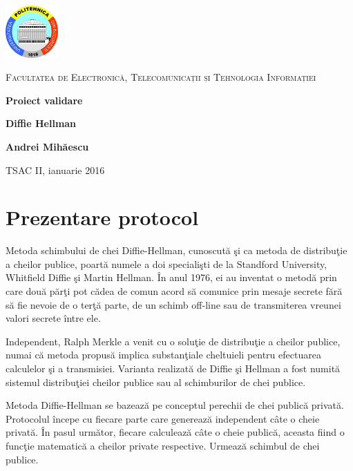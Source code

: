 \documentclass[12pt, a4paper, oneside, romanian]{teza-upb}
\begin{document}
\begin{titlepage}
	\centering
	\includegraphics[width=0.15\textwidth]{img/UPB-logo.png}\par\vspace{1cm}
	{\scshape\LARGE Facultatea de Electronică, Telecomunicații și Tehnologia Informației \par}
	\vspace{1cm}
	{\huge\bfseries Proiect validare\par}
	\vspace{2cm}
	{\Large\bfseries Diffie Hellman\par}
	\vspace{2cm}
	{\Large\bfseries Andrei Mihăescu\par}
	{\large TSAC II, ianuarie 2016\par}

\end{titlepage}
\newpage

\chapter{Prezentare protocol}	
Metoda schimbului de chei Diffie-Hellman, cunoscută şi ca metoda de distribuţie a cheilor publice, poartă numele a doi specialişti de la Standford University, Whitfield Diffie şi Martin Hellman. În anul 1976, ei au inventat o metodă prin care două părţi pot cădea de comun acord să comunice prin mesaje secrete fără să fie nevoie de o terţă parte, de un schimb off-line sau de transmiterea vreunei valori secrete între ele.

Independent, Ralph Merkle a venit cu o soluţie de distribuţie a cheilor publice, numai că metoda propusă implica substanţiale cheltuieli pentru efectuarea calculelor şi a transmisiei. Varianta realizată de Diffie şi Hellman a fost numită sistemul distribuţiei cheilor publice sau al schimburilor de chei publice.

Metoda Diffie-Hellman se bazează pe conceptul perechii de chei publică privată.
Protocolul începe cu fiecare parte care generează independent câte o cheie privată. În pasul următor, fiecare calculează câte o cheie publică, aceasta fiind o funcţie matematică a cheilor private respective. Urmează schimbul de chei publice.
\end{document}
